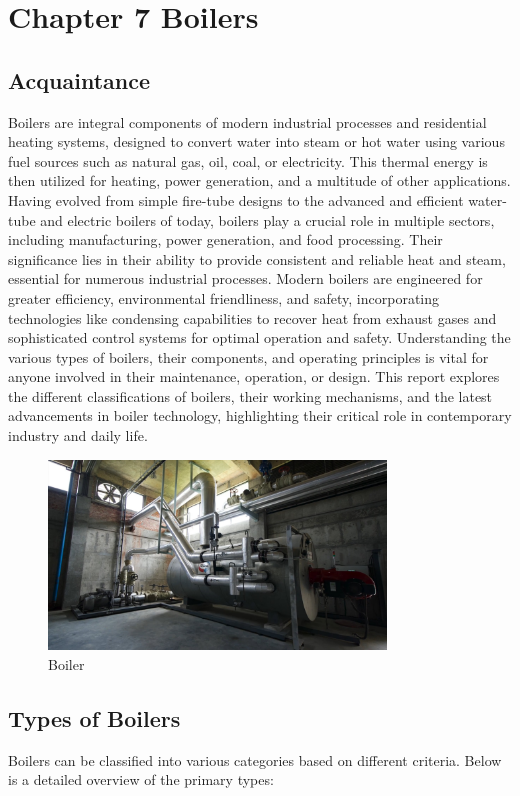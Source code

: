 \section{Chapter 7 Boilers}
\subsection{Acquaintance}
Boilers are integral components of modern industrial processes and residential heating systems, designed to convert water into steam or hot water using various fuel sources such as natural gas, oil, coal, or electricity. This thermal energy is then utilized for heating, power generation, and a multitude of other applications. Having evolved from simple fire-tube designs to the advanced and efficient water-tube and electric boilers of today, boilers play a crucial role in multiple sectors, including manufacturing, power generation, and food processing. Their significance lies in their ability to provide consistent and reliable heat and steam, essential for numerous industrial processes. Modern boilers are engineered for greater efficiency, environmental friendliness, and safety, incorporating technologies like condensing capabilities to recover heat from exhaust gases and sophisticated control systems for optimal operation and safety. Understanding the various types of boilers, their components, and operating principles is vital for anyone involved in their maintenance, operation, or design. This report explores the different classifications of boilers, their working mechanisms, and the latest advancements in boiler technology, highlighting their critical role in contemporary industry and daily life.

\begin{figure}[h]
\centering
\includegraphics[width=0.8\textwidth]{figs/boiler.jpg}
\caption{Boiler}
\label{fig:boiler}
\end{figure}


\subsection{Types of Boilers}
Boilers can be classified into various categories based on different criteria. Below is a detailed overview of the primary types:

